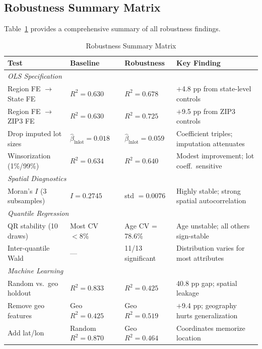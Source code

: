 \subsection{Robustness Summary Matrix}
\label{sec:robustness_matrix}

Table~\ref{tab:robustness_matrix} provides a comprehensive summary of all robustness findings.

\begin{table}[H]
\centering
\caption{Robustness Summary Matrix}
\label{tab:robustness_matrix}
\begin{threeparttable}
\footnotesize
\begin{tabular}{p{3.5cm}p{2.5cm}p{2.5cm}p{4.5cm}}
\toprule
Test & Baseline & Robustness & Key Finding \\
\midrule
\multicolumn{4}{l}{\textit{OLS Specification}} \\
Region FE $\rightarrow$ State FE & $R^2 = 0.630$ & $R^2 = 0.678$ & $+$4.8 pp from state-level controls \\
Region FE $\rightarrow$ ZIP3 FE & $R^2 = 0.630$ & $R^2 = 0.725$ & $+$9.5 pp from ZIP3 controls \\
Drop imputed lot sizes & $\hat{\beta}_{\ln\text{lot}} = 0.018$ & $\hat{\beta}_{\ln\text{lot}} = 0.059$ & Coefficient triples; imputation attenuates \\
Winsorization (1\%/99\%) & $R^2 = 0.634$ & $R^2 = 0.640$ & Modest improvement; lot coeff.\ sensitive \\
\midrule
\multicolumn{4}{l}{\textit{Spatial Diagnostics}} \\
Moran's $I$ (3 subsamples) & $I = 0.2745$ & std $= 0.0076$ & Highly stable; strong spatial autocorrelation \\
\midrule
\multicolumn{4}{l}{\textit{Quantile Regression}} \\
QR stability (10 draws) & Most CV $< 8\%$ & Age CV = 78.6\% & Age unstable; all others sign-stable \\
Inter-quantile Wald & --- & 11/13 significant & Distribution varies for most attributes \\
\midrule
\multicolumn{4}{l}{\textit{Machine Learning}} \\
Random vs.\ geo holdout & $R^2 = 0.833$ & $R^2 = 0.425$ & 40.8 pp gap; spatial leakage \\
Remove geo features & Geo $R^2 = 0.425$ & Geo $R^2 = 0.519$ & $+$9.4 pp; geography hurts generalization \\
Add lat/lon & Random $R^2 = 0.870$ & Geo $R^2 = 0.464$ & Coordinates memorize location \\

\end{tabular}
\end{threeparttable}
\end{table}
